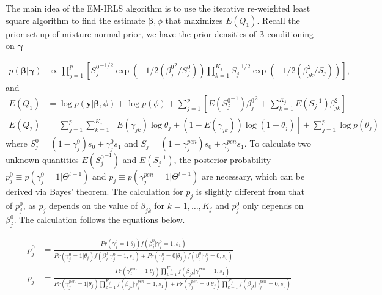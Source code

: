\documentclass[AMA,STIX1COL,]{WileyNJD-v2}
\begin{document}
The main idea of the EM-IRLS algorithm is to use the iterative
re-weighted least square algorithm to find the estimate
\(\boldsymbol{\beta}, \phi\) that maximizes \(E(Q_1)\). Recall the prior
set-up of mixture normal prior, we have the prior densities of
\(\boldsymbol{\beta}\) conditioning on \(\boldsymbol{\gamma}\)

\[
\begin{aligned}
p(\boldsymbol{\beta }| \boldsymbol{\gamma}) &\propto \prod\limits_{j=1}^{p}\left[{S^0_j}^{-1/2}\exp(-1/2({\beta^0_{j}}^2/S^0_{j}))\prod\limits_{k=1}^{K_j}S_{j}^{-1/2}\exp(-1/2(\beta_{jk}^2/S_{j}))\right],%
\end{aligned}
\] and \begin{align*}
E(Q_1) &= \log p(\textbf{y}|\boldsymbol{\beta}, \phi) + \log p(\phi) + \sum\limits_{j=1}^{p} \left[E({S^0_j}^{-1}){\beta^0_j}^2+\sum\limits_{k=1}^{K_j}E(S^{-1}_{j})\beta_{jk}^2\right]\\
E(Q_2) &= \sum\limits_{j=1}^{p}\sum\limits_{k=1}^{K_j} \left[ E(\gamma_{jk})\log \theta_j + (1-E(\gamma_{jk})) \log (1-\theta_j)\right] +  \sum\limits_{j=1}^{p}\log p(\theta_j)
\end{align*} where
\(S_{j}^0 = (1-\gamma^{0}_{j}) s_0 + \gamma^{0}_{j} s_1\) and
\(S_{j} = (1-\gamma^{pen}_{j}) s_0 + \gamma^{pen}_{j} s_1\). To
calculate two unknown quantities \(E({S_j^0}^{-1})\) and
\(E(S^{-1}_j)\), the posterior probability
\(p^0_{j} \equiv p(\gamma^{0}_{j}=1|\Theta^{t-1})\) and
\(p_{j} \equiv p(\gamma^{pen}_{j}=1|\Theta^{t-1})\) are necessary, which
can be derived via Bayes' theorem. The calculation for \(p_j\) is
slightly different from that of \(p^0_j\), as \(p_j\) depends on the
value of \(\beta_{jk}\) for \(k=1, \dots, K_j\) and \(p^0_j\) only
depends on \(\beta_j^0\). The calculation follows the equations below.

\[
\begin{aligned}
p_{j}^0 &= \frac{Pr(\gamma_{j}^0 = 1|\theta_j)f(\beta_{j}^0|\gamma_{j}^0=1, s_1) }{Pr(\gamma_{j}^0 = 1|\theta_j)f(\beta_{j}^0|\gamma_{j}^0=1, s_1) + Pr(\gamma_{j}^0 = 0|\theta_j)f(\beta^0_{j}|\gamma^0_{j}=0, s_0)}\\
p_{j} &= \frac{Pr(\gamma^{pen}_{j} = 1|\theta_j)\prod\limits_{k=1}^{K_j}f(\beta_{jk}|\gamma^{pen}_{j}=1, s_1) }{Pr(\gamma^{pen}_{j} = 1|\theta_j)\prod\limits_{k=1}^{K_j}f(\beta_{jk}|\gamma^{pen}_{j}=1, s_1) + Pr(\gamma^{pen}_{j} = 0|\theta_j)\prod\limits_{k=1}^{K_j}f(\beta_{jk}|\gamma^{pen}_{j}=0, s_0)}
\end{aligned}
\]
\end{document}
